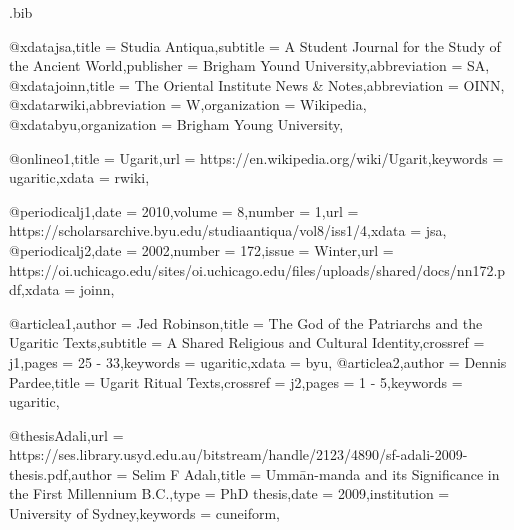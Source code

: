 \begin{filecontents*}[overwrite]{\jobname.bib}

@xdata{jsa,title = {Studia Antiqua},subtitle = {A Student Journal for the Study of the Ancient World},publisher = {Brigham Yound University},abbreviation = {SA},}
@xdata{joinn,title = {The Oriental Institute News \& Notes},abbreviation = {OINN},}
@xdata{rwiki,abbreviation = {W},organization = {Wikipedia},}
@xdata{byu,organization = {Brigham Young University},}


@online{o1,title = {Ugarit},url = {https://en.wikipedia.org/wiki/Ugarit},keywords = {ugaritic},xdata = {rwiki},}


@periodical{j1,date = {2010},volume = {8},number = {1},url = {https://scholarsarchive.byu.edu/studiaantiqua/vol8/iss1/4},xdata = {jsa},}
@periodical{j2,date = {2002},number = {172},issue = {Winter},url = {https://oi.uchicago.edu/sites/oi.uchicago.edu/files/uploads/shared/docs/nn172.pdf},xdata = {joinn},}

@article{a1,author = {Jed Robinson},title = {The God of the Patriarchs and the Ugaritic Texts},subtitle = {A Shared Religious and Cultural Identity},crossref = {j1},pages = {25 - 33},keywords = {ugaritic},xdata = {byu},}
@article{a2,author = {Dennis Pardee},title = {Ugarit Ritual Texts},crossref = {j2},pages = {1 - 5},keywords = {ugaritic},}
	
@thesis{Adali,url = {https://ses.library.usyd.edu.au/bitstream/handle/2123/4890/sf-adali-2009-thesis.pdf},author = {Selim F Adalı},title = {Ummān-manda and its Significance in the First Millennium B.C.},type = {PhD thesis},date = {2009},institution = {University of Sydney},keywords = {cuneiform},}

\end{filecontents*}




\documentclass{article}

\usepackage[table]{xcolor}
\pagecolor{green!3}
\newcommand\theadercolour{red!20!yellow}
\usepackage{fontspec}
\usepackage[listings]{tcolorbox}
\usepackage{longtable}
\usepackage[nil,english]{babel}
\usepackage[english=british]{csquotes}
\usepackage{multicol}
\setlength{\columnsep}{0.3cm} \setlength{\columnseprule}{1pt}


\setmainfont{Noto Serif}
\setsansfont{Noto Sans}

\newfontfamily{}[Scale=1.5]
\newfontfamily{}[Scale=1.5]


